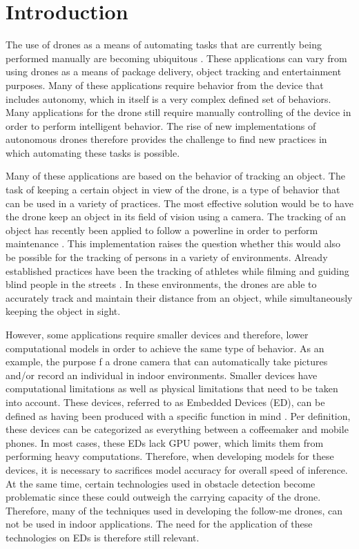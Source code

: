 \section{Introduction}
The use of drones as a means of automating tasks that are currently being 
performed manually are becoming ubiquitous 
\cite{application1cardiac, application2forestfires, blindrunnersdrone,PowerlineFollower}. 
These applications can vary from using drones as a means of package delivery, 
object tracking and entertainment purposes. Many of these applications require 
behavior from the device that includes autonomy, which in itself is a very complex
defined set of behaviors. Many applications for the drone
still require manually controlling of the device in order to perform intelligent behavior. 
The rise of new implementations of autonomous drones therefore provides the challenge 
to find new practices in which automating these tasks is possible. 

Many of these applications are based on the behavior of tracking an object. 
The task of keeping a certain object in view of the drone, is a type of behavior 
that can be used in a variety of practices. The most effective solution would 
be to have the drone keep an object in its field of vision using a camera.
The tracking of an object has recently been applied to follow a powerline 
in order to perform maintenance \cite{PowerlineFollower}. 
This implementation raises the question whether this would also be possible 
for the tracking of persons in a variety of environments. Already established practices
have been the tracking of athletes while filming \cite{application3sports} and 
guiding blind people in the streets \cite{blindrunnersdrone}. In these environments, 
the drones are able to accurately track and maintain their distance from an object, 
while simultaneously keeping the object in sight. 

However, some applications require smaller devices and therefore, lower computational models
in order to achieve the same type of behavior. As an example, the purpose
f a drone camera that can automatically take pictures and/or record an 
individual in indoor environments. Smaller devices have computational limitations 
as well as physical limitations that need to be taken into account. 
These devices, referred to as Embedded Devices (ED), can be defined as having been 
produced with a specific function in mind \cite{embeddedsystem}. Per definition, 
these devices can be categorized as everything between a coffeemaker and mobile 
phones. In most cases, these EDs lack GPU power, which limits them from performing 
heavy computations. Therefore, when developing models for these devices, it is 
necessary to sacrifices model accuracy for overall speed of inference. At the same time, certain 
technologies used in obstacle detection become problematic since these 
could outweigh the carrying capacity of the drone. Therefore, many of the techniques 
used in developing the follow-me drones, can not be used in indoor applications. 
The need for the application of these technologies on EDs is therefore still relevant. 

